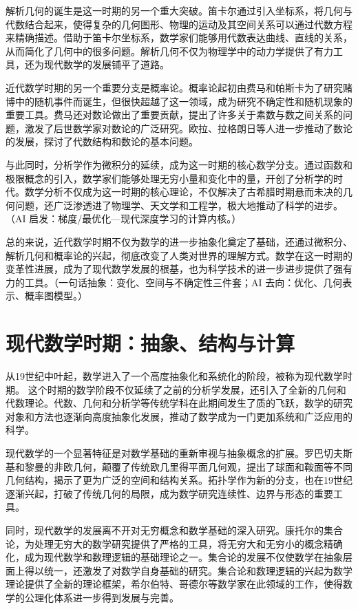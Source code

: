 解析几何的诞生是这一时期的另一个重大突破。笛卡尔通过引入坐标系，将几何与代数结合起来，使得复杂的几何图形、物理的运动及其空间关系可以通过代数方程来精确描述。借助于笛卡尔坐标系，数学家们能够用代数表达曲线、直线的关系，从而简化了几何中的很多问题。解析几何不仅为物理学中的动力学提供了有力工具，还为现代数学的发展铺平了道路。

近代数学时期的另一个重要分支是概率论。概率论起初由费马和帕斯卡为了研究赌博中的随机事件而诞生，但很快超越了这一领域，成为研究不确定性和随机现象的重要工具。费马还对数论做出了重要贡献，提出了许多关于素数与数之间关系的问题，激发了后世数学家对数论的广泛研究。欧拉、拉格朗日等人进一步推动了数论的发展，探讨了代数结构和数论的基本问题。

与此同时，分析学作为微积分的延续，成为这一时期的核心数学分支。通过函数和极限概念的引入，数学家们能够处理无穷小量和变化中的量，开创了分析学的时代。数学分析不仅成为这一时期的核心理论，不仅解决了古希腊时期悬而未决的几何问题，还广泛渗透进了物理学、天文学和工程学，极大地推动了科学的进步。{（AI 启发：梯度/最优化—现代深度学习的计算内核。）}


总的来说，近代数学时期不仅为数学的进一步抽象化奠定了基础，还通过微积分、解析几何和概率论的兴起，彻底改变了人类对世界的理解方式。数学在这一时期的变革性进展，成为了现代数学发展的根基，也为科学技术的进一步进步提供了强有力的工具。{（一句话抽象：变化、空间与不确定性三件套；AI 去向：优化、几何表示、概率图模型。）}

\section{现代数学时期：抽象、结构与计算}
从19世纪中叶起，数学进入了一个高度抽象化和系统化的阶段，被称为现代数学时期。
这个时期的数学阶段不仅延续了之前的分析学发展，还引入了全新的几何和代数理论。代数、几何和分析学等传统学科在此期间发生了质的飞跃，数学的研究对象和方法也逐渐向高度抽象化发展，推动了数学成为一门更加系统和广泛应用的科学。

现代数学的一个显著特征是对数学基础的重新审视与抽象概念的扩展。罗巴切夫斯基和黎曼的非欧几何，颠覆了传统欧几里得平面几何观，提出了球面和鞍面等不同几何结构，揭示了更为广泛的空间和结构关系。拓扑学作为新的分支，也在19世纪逐渐兴起，打破了传统几何的局限，成为数学研究连续性、边界与形态的重要工具。

同时，现代数学的发展离不开对无穷概念和数学基础的深入研究。康托尔的集合论，为处理无穷大的数学研究提供了严格的工具，将无穷大和无穷小的概念精确化，成为现代数学和数理逻辑的基础理论之一。集合论的发展不仅使数学在抽象层面上得以统一，还激发了对数学自身基础的研究。集合论和数理逻辑的兴起为数学理论提供了全新的理论框架，希尔伯特、哥德尔等数学家在此领域的工作，使得数学的公理化体系进一步得到发展与完善。

